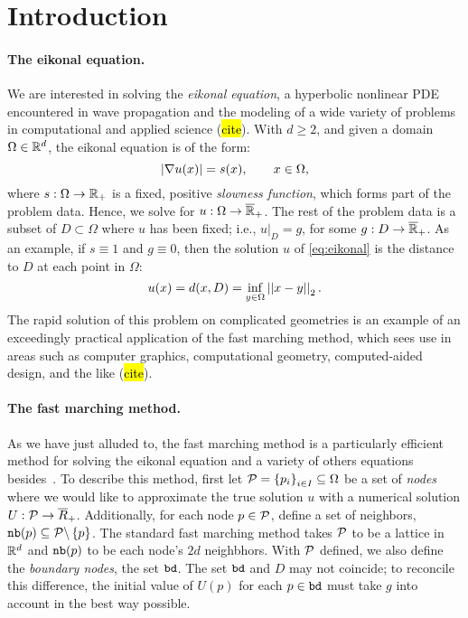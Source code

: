 \documentclass[eikonal.tex]{subfiles}
\begin{document}
\section{Introduction}

\paragraph{The eikonal equation.} We are interested in solving the
\emph{eikonal equation}, a hyperbolic nonlinear PDE encountered in
wave propagation and the modeling of a wide variety of problems in
computational and applied science (\hl{cite}). With $d \geq 2$, and
given a domain $\Omega \in \mathbb{R}^d$, the eikonal equation is of the form:
\begin{equation}
  \label{eq:eikonal}
  \abs{\nabla u(x)} = s(x), \qquad x \in \Omega,
\end{equation}
where $s : \Omega \to \mathbb{R}_+$ is a fixed, positive \emph{slowness
  function}, which forms part of the problem data. Hence, we solve for
$u : \Omega \to \overline{\mathbb{R}}_+$. The rest of the problem data is a
subset of $D \subset \Omega$ where $u$ has been fixed; i.e.,
$\left. u \right|_D = g$, for some
$g : D \to \overline{\mathbb{R}}_+$. As an example, if $s \equiv 1$ and $g
\equiv 0$, then the solution
$u$ of \cref{eq:eikonal} is the distance to
$D$ at each point in $\Omega$:
\begin{equation}
  \label{eq:distance-to-Omega}
  u(x) = d(x, D) = \inf_{y \in \Omega} \norm{x - y}_2.
\end{equation}
The rapid solution of this problem on complicated geometries is an
example of an exceedingly practical application of the fast marching
method, which sees use in areas such as computer graphics,
computational geometry, computed-aided design, and the like
(\hl{cite}).

\paragraph{The fast marching method.} As we have just alluded to, the
fast marching method is a particularly efficient method for solving
the eikonal equation and a variety of others equations
besides~\cite{sethian1999level}. To describe this method, first let
$\mathcal{P} = \left\{p_i\right\}_{i \in I} \subseteq \Omega$ be a set of
\emph{nodes} where we would like to approximate the true solution $u$
with a numerical solution $U : \mathcal{P} \to
\overline{R}_+$. Additionally, for each node $p \in \mathcal{P}$, define a
set of neighbors, $\texttt{nb}(p) \subseteq \mathcal{P} \backslash \left\{p\right\}$. The
standard fast marching method takes $\mathcal{P}$ to be a lattice in $\mathbb{R}^d$
and $\texttt{nb}(p)$ to be each node's $2d$ neighbhors. With $\mathcal{P}$
defined, we also define the \emph{boundary nodes}, the set
$\texttt{bd}$. The set $\texttt{bd}$ and $D$ may not coincide; to
reconcile this difference, the initial value of $U(p)$ for each
$p \in \texttt{bd}$ must take $g$ into account in the best way possible.
\end{document}

